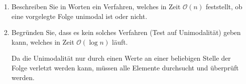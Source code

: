 \documentclass{bschlangaul-aufgabe}
\begin{document}
\begin{enumerate}
\begin{liAntwort}


\end{liAntwort}


\item Beschreiben Sie in Worten ein Verfahren, welches in Zeit
$\mathcal{O}(n)$ feststellt, ob eine vorgelegte Folge unimodal ist oder
nicht.

\begin{liAntwort}
\end{liAntwort}


\item Begründen Sie, dass es kein solches Verfahren (Test auf
Unimodalität) geben kann, welches in Zeit $\mathcal{O}(\log n)$ läuft.

\begin{liAntwort}
Da die Unimodalität nur durch einen Werte an einer beliebigen Stelle der
Folge verletzt werden kann, müssen alle Elemente durchsucht und
überprüft werden.
\end{liAntwort}
\end{enumerate}

\begin{liAntwort}


\end{liAntwort}
\end{document}
